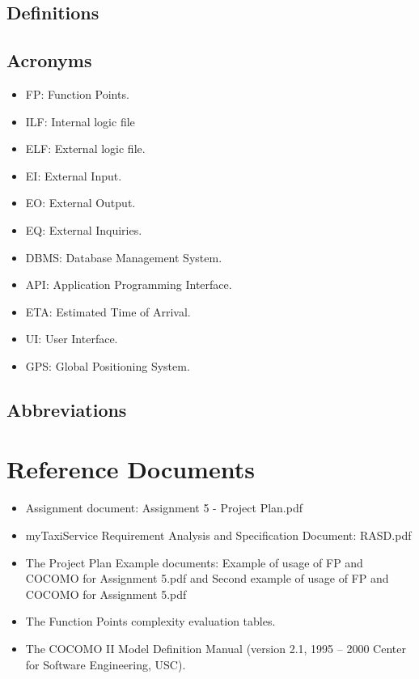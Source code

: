 \subsection{Definitions}
\subsection{Acronyms}
\begin{itemize}
	\item FP: Function Points.
	\item ILF: Internal logic file
	\item ELF: External logic file.
	\item EI: External Input.
	\item EO: External Output.
	\item EQ: External Inquiries.
	\item DBMS: Database Management System.
	\item API: Application Programming Interface.
	\item ETA: Estimated Time of Arrival.
	\item UI: User Interface.
	\item GPS: Global Positioning System.
\end{itemize}
\subsection{Abbreviations}
\section{Reference Documents}
\begin{itemize}
	\item Assignment document: Assignment 5 - Project Plan.pdf
	\item myTaxiService Requirement Analysis and Specification Document: RASD.pdf
	\item The Project Plan Example documents: Example of usage of FP and COCOMO for Assignment 5.pdf and Second example of usage of FP and COCOMO for Assignment 5.pdf
	\item The Function Points complexity evaluation tables.
	\item The COCOMO II Model Definition Manual (version 2.1,  1995 – 2000 Center for Software Engineering, USC).
\end{itemize} 